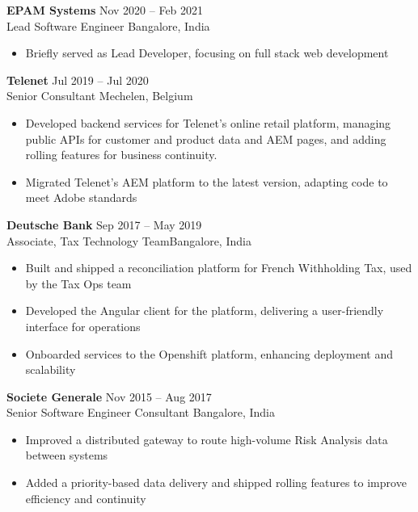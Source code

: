 \documentclass[a4paper,9pt]{article}  %
\begin{document}
\textbf{EPAM Systems} \hfill Nov 2020 -- Feb 2021\\
Lead Software Engineer \hfill Bangalore, India \vspace{-5pt}\\
\begin{itemize}[left=0pt, label=\textbullet, itemsep=0pt, parsep=0pt, topsep=0pt, partopsep=0pt]
    \item Briefly served as Lead Developer, focusing on full stack web development
\end{itemize}
\vspace{8pt}

\textbf{Telenet} \hfill Jul 2019 -- Jul 2020\\
Senior Consultant \hfill Mechelen, Belgium\vspace{-5pt}\\
\begin{itemize}[left=0pt, label=\textbullet, itemsep=0pt, parsep=0pt, topsep=0pt, partopsep=0pt]
    \item Developed backend services for Telenet’s online retail platform, managing public APIs for customer and product data and AEM pages, and adding rolling features for business continuity.
    \item Migrated Telenet's AEM platform to the latest version, adapting code to meet Adobe standards
\end{itemize}
\vspace{8pt}

\textbf{Deutsche Bank} \hfill Sep 2017 -- May 2019 \\
Associate, Tax Technology Team\hfill Bangalore, India \vspace{-5pt}\\
\begin{itemize}[left=0pt, label=\textbullet, itemsep=0pt, parsep=0pt, topsep=0pt, partopsep=0pt]
    \item Built and shipped a reconciliation platform for French Withholding Tax, used by the Tax Ops team
    \item Developed the Angular client for the platform, delivering a user-friendly interface for operations
    \item Onboarded services to the Openshift platform, enhancing deployment and scalability
\end{itemize}
\vspace{8pt}

\textbf{Societe Generale} \hfill Nov 2015 -- Aug 2017 \\
Senior Software Engineer Consultant \hfill Bangalore, India \vspace{-5pt}\\
\begin{itemize}[left=0pt, label=\textbullet, itemsep=0pt, parsep=0pt, topsep=0pt, partopsep=0pt]
    \item Improved a distributed gateway to route high-volume Risk Analysis data between systems
    \item Added a priority-based data delivery and shipped rolling features to improve efficiency and continuity
\end{itemize}
\vspace{8pt}
\end{document}
